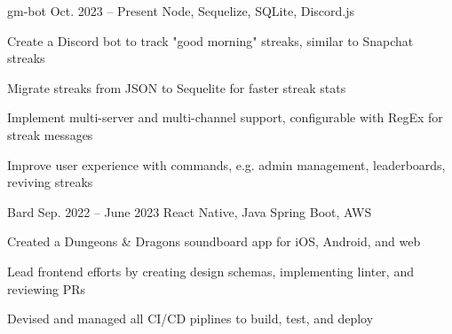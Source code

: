 \fontdir[fonts/]

\begin{cvprojects}

  \cvproject
  {gm-bot}
  {\href{https://github.com/KevinIsMyName/gm-bot}{\faGithubSquare\acvHeaderIconSep\@KevinIsMyName}}
  {Oct. 2023 -- Present}
  {Node, Sequelize, SQLite, Discord.js}
  {
    \begin{cvitems}
      \item Create a Discord bot to track "good morning" streaks, similar to Snapchat streaks
      \item Migrate streaks from JSON to Sequelite for faster streak stats
      \item Implement multi-server and multi-channel support, configurable with RegEx for streak messages
      \item Improve user experience with commands, e.g. admin management, leaderboards, reviving streaks
    \end{cvitems}
  }


  \cvproject
  {Bard}
  {\href{https://gitlab.com/drexel_se/senior_project/ay22_bard/bard}{\faGithubSquare\acvHeaderIconSep\@KevinIsMyName}}
  {Sep. 2022 -- June 2023}
  {React Native, Java Spring Boot, AWS}
  {
    \begin{cvitems}
      \item Created a Dungeons \& Dragons soundboard app for iOS, Android, and web
      \item Lead frontend efforts by creating design schemas, implementing linter, and reviewing PRs
      \item Devised and managed all CI/CD piplines to build, test, and deploy
    \end{cvitems}
  }




\end{cvprojects}
